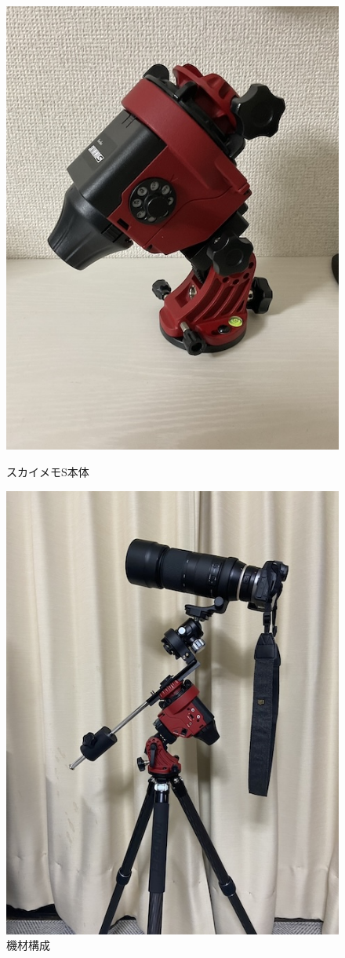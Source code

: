 \begin{figure}[H]
  \centering
  \begin{minipage}{0.45\linewidth}
    \centering
    \includegraphics[width=0.8\linewidth]{sections/Kokubun/pictures/本体.jpg}
    \caption{スカイメモS本体}
    \label{本体}
  \end{minipage}
  \begin{minipage}{0.45\linewidth}
    \centering
    \includegraphics[width=0.8\linewidth]{sections/Kokubun/pictures/構成例.jpg}
    \caption{機材構成}
    \label{構成}
  \end{minipage}
\end{figure}

